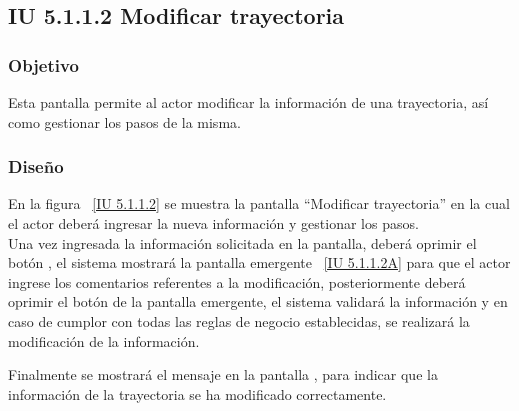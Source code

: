 \subsection{IU 5.1.1.2 Modificar trayectoria}

\subsubsection{Objetivo}
	
	Esta pantalla permite al actor modificar la información de una trayectoria, así como gestionar los pasos de la misma.

\subsubsection{Diseño}

    En la figura ~\ref{IU 5.1.1.2} se muestra la pantalla ``Modificar trayectoria'' en la cual el actor deberá ingresar la nueva información y gestionar los pasos.\\
      
    Una vez ingresada la información solicitada en la pantalla, deberá oprimir el botón , el sistema mostrará la pantalla emergente ~\ref{IU 5.1.1.2A} para que el actor ingrese los comentarios referentes a la modificación, posteriormente deberá oprimir el botón  de la pantalla emergente, el sistema validará la información y en caso de cumplor con todas las reglas de negocio establecidas, se realizará la modificación de la información.
	    
    Finalmente se mostrará el mensaje  en la pantalla , para indicar que la información de la trayectoria se ha modificado correctamente.        





